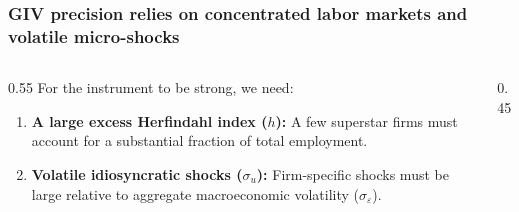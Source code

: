 \documentclass[aspectratio=169,11pt]{beamer}
\begin{document}
\begin{frame}
    \frametitle{GIV precision relies on concentrated labor markets and volatile micro-shocks}

    \begin{columns}[T]
        \begin{column}{0.55\textwidth}
            \vspace{0.5cm}
            {\Large
                For the instrument to be strong, we need:
            }

            \vspace{0.8cm}
            \begin{enumerate}
                \item \textbf{A large excess Herfindahl index ($h$):} A few superstar firms must account for a substantial fraction of total employment.
                      \vspace{0.4cm}
                \item \textbf{Volatile idiosyncratic shocks ($\sigma_u$):} Firm-specific shocks must be large relative to aggregate macroeconomic volatility ($\sigma_\varepsilon$).
            \end{enumerate}
        \end{column}

        \begin{column}{0.45\textwidth}
            \vspace{1.5cm}
        \end{column}
    \end{columns}

\end{frame}
\end{document}
